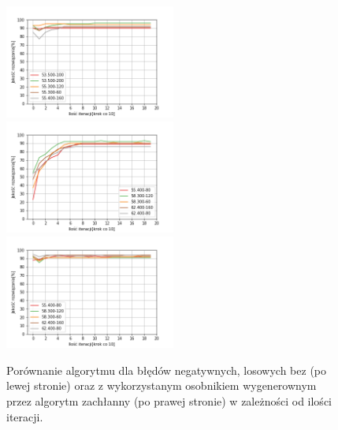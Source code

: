 \documentclass{article}
\begin{document}
\begin{figure}[H]
\includegraphics[width=0.5\textwidth]{neg-los-greedy3.png}
\includegraphics[width=0.5\textwidth]{neg-los4.png}
\includegraphics[width=0.5\textwidth]{neg-los-greedy4.png}
\caption{Porównanie algorytmu dla błędów negatywnych, losowych bez (po lewej stronie) oraz z wykorzystanym osobnikiem wygenerownym przez algorytm zachłanny (po prawej stronie) w zależności od ilości iteracji.}
\end{figure}
\end{document}
